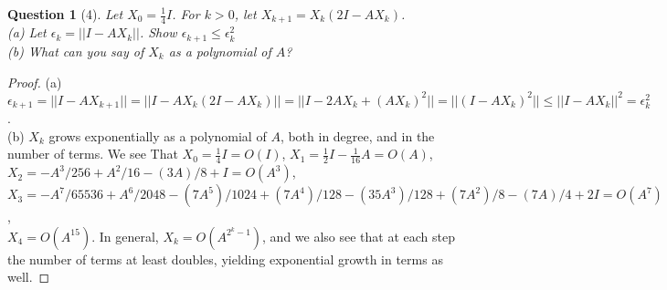 \documentclass[11pt]{article}
\theoremstyle{quest}
\newtheorem*{question}{Question}
\begin{document}
\begin{question}[4]
Let $X_0 = \frac{1}{4}I$. For $k > 0$, let $X_{k+1} = X_k(2I - AX_k)$.
\\(a) Let $\epsilon_k = ||I - AX_k||$. Show $\epsilon_{k+1} \le \epsilon_k^2$
\\(b) What can you say of $X_k$ as a polynomial of $A$?
\end{question}
\begin{proof}
(a) $\epsilon_{k+1} = ||I - AX_{k+1}|| = ||I - AX_k(2I-AX_k)|| = ||I - 2AX_k + (AX_k)^2|| = ||(I - AX_k)^2|| \le ||I - AX_k||^2 = \epsilon_k^2$.
\\(b) $X_k$ grows exponentially as a polynomial of $A$, both in degree, and in the number of terms. We see That $X_0 = \frac{1}{4}I = O(I)$, $X_1 = \frac{1}{2}I - \frac{1}{16}A = O(A)$, \\$X_2 = -A^3/256 + A^2/16 - (3 A)/8 + I = O(A^3)$, \\$X_3 = -A^7/65536 + A^6/2048 - (7 A^5)/1024 + (7 A^4)/128 - (35 A^3)/128 + (7 A^2)/8 - (7 A)/4 + 2I = O(A^7)$, \\$X_4 = O(A^{15})$. In general, $X_k = O(A^{2^k-1})$, and we also see that at each step the number of terms at least doubles, yielding exponential growth in terms as well.
\end{proof}
\end{document}
